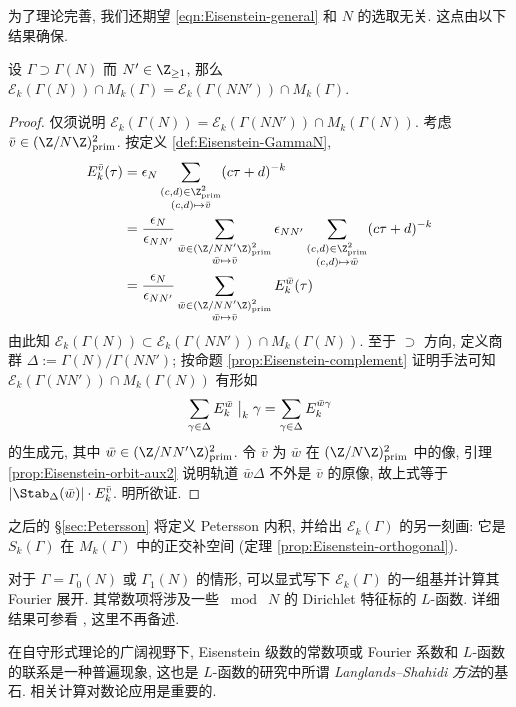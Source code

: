 为了理论完善, 我们还期望 \eqref{eqn:Eisenstein-general} 和 $N$ 的选取无关. 这点由以下结果确保.
\begin{proposition}
	设 $\Gamma \supset \Gamma(N)$ 而 $N' \in \Z_{\geq 1}$, 那么 $\mathcal{E}_k(\Gamma(N)) \cap M_k(\Gamma) = \mathcal{E}_k(\Gamma(NN')) \cap M_k(\Gamma)$.
\end{proposition}
\begin{proof}
	仅须说明 $\mathcal{E}_k(\Gamma(N)) = \mathcal{E}_k(\Gamma(NN')) \cap M_k(\Gamma(N))$. 考虑 $\bar{v} \in (\Z/N\Z)^2_{\mathrm{prim}}$. 按定义 \ref{def:Eisenstein-GammaN},
	\begin{align*}
		E^{\bar{v}}_k(\tau) & = \epsilon_N \sum_{\substack{(c, d) \in \Z^2_{\mathrm{prim}} \\ (c,d) \mapsto \bar{v} }} (c\tau + d)^{-k} \\
		& = \dfrac{\epsilon_N}{\epsilon_{NN'}} \sum_{\substack{ \bar{w} \in (\Z/NN'\Z)^2_{\mathrm{prim}} \\ \bar{w} \mapsto \bar{v}}} \epsilon_{NN'} \sum_{\substack{(c, d) \in \Z^2_{\mathrm{prim}} \\ (c,d) \mapsto \bar{w} }} (c\tau + d)^{-k} \\
		& = \dfrac{\epsilon_N}{\epsilon_{NN'}} \sum_{\substack{ \bar{w} \in (\Z/NN'\Z)^2_{\mathrm{prim}} \\ \bar{w} \mapsto \bar{v}}} E^{\bar{w}}_k(\tau)
	\end{align*}
	由此知 $\mathcal{E}_k(\Gamma(N)) \subset \mathcal{E}_k(\Gamma(NN')) \cap M_k(\Gamma(N))$. 至于 $\supset$ 方向, 定义商群 $\Delta := \Gamma(N)/\Gamma(NN')$; 按命题 \ref{prop:Eisenstein-complement} 证明手法可知 $\mathcal{E}_k(\Gamma(NN')) \cap M_k(\Gamma(N))$ 有形如
	\[ \sum_{\gamma \in \Delta} E^{\bar{w}}_k \;\big|_{k} \; \gamma = \sum_{\gamma \in \Delta} E^{\bar{w}\gamma}_k \]
	的生成元, 其中 $\bar{w} \in (\Z/NN'\Z)^2_{\mathrm{prim}}$. 令 $\bar{v}$ 为 $\bar{w}$ 在 $(\Z/N\Z)^2_{\mathrm{prim}}$ 中的像, 引理 \ref{prop:Eisenstein-orbit-aux2} 说明轨道 $\bar{w} \Delta$ 不外是 $\bar{v}$ 的原像, 故上式等于 $\left| \Stab_\Delta(\bar{w}) \right| \cdot E^{\bar{v}}_k$. 明所欲证.
\end{proof}

\begin{remark}
	之后的 \S\ref{sec:Petersson} 将定义 Petersson 内积, 并给出 $\mathcal{E}_k(\Gamma)$ 的另一刻画: 它是 $S_k(\Gamma)$ 在 $M_k(\Gamma)$ 中的正交补空间 (定理 \ref{prop:Eisenstein-orthogonal}).
\end{remark}

对于 $\Gamma = \Gamma_0(N)$ 或 $\Gamma_1(N)$ 的情形, 可以显式写下 $\mathcal{E}_k(\Gamma)$ 的一组基并计算其 Fourier 展开. 其常数项将涉及一些 $\bmod\; N$ 的 Dirichlet 特征标的 $L$-函数. 详细结果可参看 \cite[\S 4.5]{DS05}, 这里不再备述.

在自守形式理论的广阔视野下, Eisenstein 级数的常数项或 Fourier 系数和 $L$-函数的联系是一种普遍现象, 这也是 $L$-函数的研究中所谓 \emph{Langlands--Shahidi 方法}的基石. 相关计算对数论应用是重要的.

